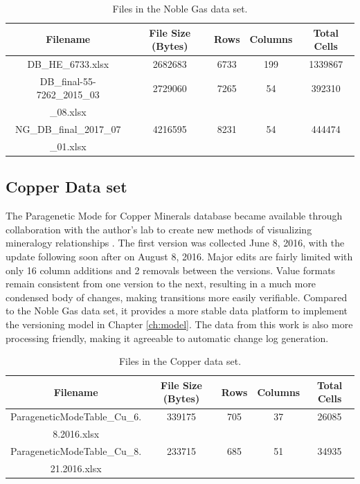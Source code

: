 \begin{table}
	\caption{Files in the Noble Gas data set.}
	\label{noble_gas_file_table}
	\centering
	\begin{tabular}{|c|c|c|c|c|}
		\hline
		Filename & File Size (Bytes) & Rows & Columns &	Total Cells \\ \hline
		DB\_HE\_6733.xlsx &	2682683 &	6733 &	199 &	1339867 \\
		DB\_final-55-7262\_2015\_03 &	2729060 &	7265 &	54 &	392310 \\
		\_08.xlsx&&&&\\
		NG\_DB\_final\_2017\_07 &	4216595 &	8231 &	54 &	444474 \\
		\_01.xlsx&&&&\\
		\hline
	\end{tabular}
\end{table}

\subsection{Copper Data set}

The Paragenetic Mode for Copper Minerals database became available through collaboration with the author's lab to create new methods of visualizing mineralogy relationships \cite{Morrison2016}.
The first version was collected June 8, 2016, with the update following soon after on August 8, 2016.
Major edits are fairly limited with only 16 column additions and 2 removals between the versions.
Value formats remain consistent from one version to the next, resulting in a much more condensed body of changes, making transitions more easily verifiable.
Compared to the Noble Gas data set, it provides a more stable data platform to implement the versioning model in Chapter \ref{ch:model}.
The data from this work is also more processing friendly, making it agreeable to automatic change log generation.

\begin{table}
	\caption{Files in the Copper data set.}
	\label{copper_file_table}
	\centering
	\begin{tabular}{|c|c|c|c|c|}
		\hline
		Filename & File Size (Bytes) & Rows & Columns &	Total Cells \\ \hline
		ParageneticModeTable\_Cu\_6. &	339175 & 705 &	37 &	26085\\
		8.2016.xlsx&&&&\\
		ParageneticModeTable\_Cu\_8. & 233715 & 685 & 51 & 34935\\
		21.2016.xlsx&&&&\\
		\hline
	\end{tabular}
\end{table}

